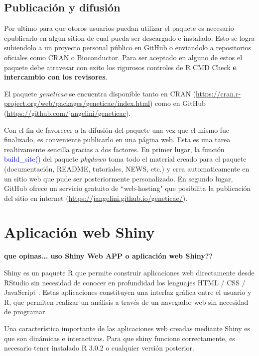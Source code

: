 \subsection{Publicación y difusión}

Por ultimo para que otoros usuarios puedan utilizar el paquete es necesario cpublicarlo en algun sition de cual pueda ser descargado e instalado. Esto se logra subiendolo a un proyecto personal público en GitHub o enviandolo a repositorios oficiales como CRAN o Bioconductor. Para ser aceptado en alguno de estos el paquete debe atravesar con exito los rigurosos controles de R CMD Check \textbf{e intercambio con los revisores}.

El paquete \emph{geneticae} se encuentra disponible tanto en CRAN (\url{https://cran.r-project.org/web/packages/geneticae/index.html}) como en GitHub (\url{https://github.com/jangelini/geneticae}). 

Con el fin de favorecer a la difusión del paquete una vez que el mismo fue finalizado, es conveniente publicarlo en una página web. Esta es una tarea realtivamente sencilla gracias a dos factores. En primer lugar, la función \textcolor{blue}{build\_site()} del paquete \emph{pkgdown} toma todo el material creado para el paquete (documentación, README, tutoriales, NEWS, etc.) y crea automaticamente en un sitio web que pude ser posteriormente personalizado. En segundo lugar, GitHub ofrece un servicio gratuito de ``web-hosting" que posibilita la publicación del sitio en internet (\url{https://jangelini.github.io/geneticae/}).



\section{Aplicación web Shiny}
{\LARGE{\textbf{que opinas... uso Shiny Web APP o aplicación web Shiny??}}}

Shiny es un paquete R que permite construir aplicaciones web directamente desde RStudio sin necesidad de conocer en profundidad los lenguajes HTML / CSS / JavaScript . Estas aplicaciones constituyen una interfaz gráfica entre el usuario y R, que permiten realizar un análisis a través de un navegador web sin necesidad de programar.

Una característica importante de las aplicaciones web creadas mediante Shiny es que son dinámicas e interactivas. Para que shiny funcione correctamente, es necesario tener instalado R 3.0.2 o cualquier versión posterior.

